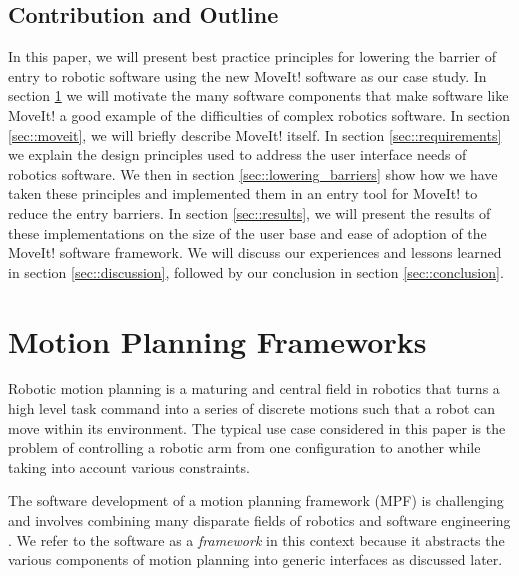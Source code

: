 \documentclass[10pt,journal,compsoc]{joser1}
\begin{document}
{%
\subsection{Contribution and Outline}

In this paper, we will present best practice principles for lowering the barrier
of entry to robotic software using the new MoveIt! software \cite{moveit} as our
case study. In section \ref{sec::motion_planning} we will motivate the many
software components that make software like MoveIt! a good example of the
difficulties of complex robotics software. In section \ref{sec::moveit}, we will
briefly describe MoveIt! itself. In section \ref{sec::requirements} we explain
the design principles used to address the user interface needs of robotics
software. We then in section \ref{sec::lowering_barriers} show how we have taken these principles and implemented them
in an entry tool for MoveIt! to reduce the entry barriers. In section \ref{sec::results}, we will present the
results of these implementations on the size of the user base and ease of
adoption of the MoveIt! software framework. We will discuss our experiences and
lessons learned in section \ref{sec::discussion}, followed by our conclusion in
section \ref{sec::conclusion}.

\section{Motion Planning Frameworks}
\label{sec::motion_planning}

Robotic motion planning is a maturing and central field in robotics
\cite{moll2011teaching} that turns a high level task command into a series of
discrete motions such that a robot can move within its environment. The typical
use case considered in this paper is the problem of controlling a robotic arm
from one configuration to another while taking into account various constraints.

The software development of a motion planning framework (MPF) is challenging and
involves combining many disparate fields of robotics and software engineering
\cite{perez2010roadmap}. We refer to the software as a \textit{framework} in
this context because it abstracts the various components of motion planning into
generic interfaces as discussed later.

}
\end{document}
